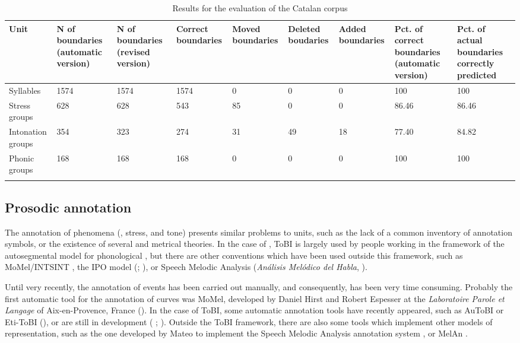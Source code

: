 \documentclass[output=paper]{langsci/langscibook}
\begin{document}
\begin{table}\small
\begin{tabularx}{\textwidth}{Q QQQQQQQQ}
\lsptoprule
Unit & N of boundaries (automatic version) & N of boundaries (revised version) & Correct boundaries & Moved boundaries & Deleted boudaries & Added boundaries & Pct. of correct boundaries (automatic version) & Pct. of actual boundaries correctly predicted \\
\midrule
Syllables & 1574 & 1574 & 1574 & 0 & 0 & 0 & 100 & 100 \\
\tablevspace
Stress groups & 628 & 628 & 543 & 85 & 0 & 0 & 86.46 & 86.46 \\
\tablevspace
Intonation groups & 354 & 323 & 274 & 31 & 49 & 18 & 77.40 & 84.82 \\
\tablevspace
Phonic groups & 168 & 168 & 168 & 0 & 0 & 0 & 100 & 100 \\
\lspbottomrule
\end{tabularx}
\caption{Results for the evaluation of the Catalan corpus \citep{Garrido2013SegProso}}
\label{tab:gar:2}
\end{table}


\subsection{Prosodic annotation} 

The annotation of  phenomena (, stress, and tone) presents similar problems to  units, such as the lack of a common inventory of annotation symbols, or the existence of several  and metrical theories. In the case of , ToBI \citep{Silverman1992} is largely used by people working in the framework of the autosegmental model for phonological , but there are other conventions which have been used outside this framework, such as MoMel/INTSINT \citep{Hirst2000}, the IPO model (\citealt{Hart.1990}; \citealt{Garrido1996}), or Speech Melodic Analysis (\textit{Análisis Melódico del Habla}, \citealt{Cantero2009}).

Until very recently, the annotation of  events has been carried out manually, and consequently, has been very time consuming. Probably the first automatic tool for the annotation of  curves was MoMel, developed by Daniel Hirst and Robert Espesser at the \textit{Laboratoire Parole et Langage} of Aix-en-Provence, France (\citealt{Hirst1993}). 
In the case of ToBI, some automatic annotation tools have recently appeared, such as AuToBI \citep{Rosenberg2010} 
or Eti-ToBI (\citealt{ElviraGarcia2015}), or are still in development (\citeauthor{Escudero2014a} \citeyear*{Escudero2014a,Escudero2014b,Escudero2014c}; \citealt{Gonzalez2014}). 
Outside the ToBI framework, there are also some tools which implement other models of  representation, such as the one developed by Mateo to implement the Speech Melodic Analysis annotation system \citep{MateoRuiz.2010protocolo,MateoRuiz.2010Scripts}, or MelAn \citep{Garrido2010}.
\end{document}
